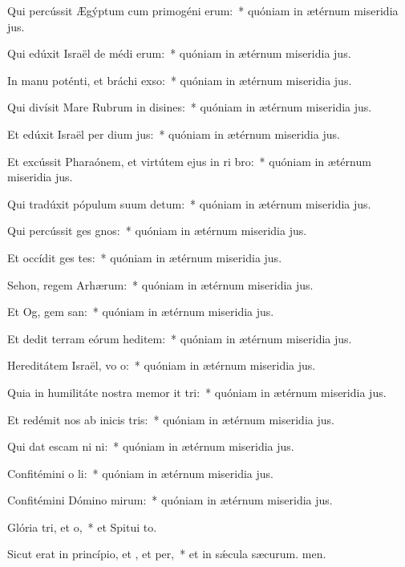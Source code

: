 \item Qui percússit Ægýptum cum primogéni erum:~* quóniam in ætérnum miseridia jus.
\item Qui edúxit Israël de médi erum:~* quóniam in ætérnum miseridia jus.
\item In manu poténti, et bráchi exso:~* quóniam in ætérnum miseridia jus.
\item Qui divísit Mare Rubrum in disines:~* quóniam in ætérnum miseridia jus.
\item Et edúxit Israël per dium jus:~* quóniam in ætérnum miseridia jus.
\item Et excússit Pharaónem, et virtútem ejus in ri bro:~* quóniam in ætérnum miseridia jus.
\item Qui tradúxit pópulum suum  detum:~* quóniam in ætérnum miseridia jus.
\item Qui percússit ges gnos:~* quóniam in ætérnum miseridia jus.
\item Et occídit ges tes:~* quóniam in ætérnum miseridia jus.
\item Sehon, regem Arhærum:~* quóniam in ætérnum miseridia jus.
\item Et Og, gem san:~* quóniam in ætérnum miseridia jus.
\item Et dedit terram eórum heditem:~* quóniam in ætérnum miseridia jus.
\item Hereditátem Israël, vo o:~* quóniam in ætérnum miseridia jus.
\item Quia in humilitáte nostra memor it tri:~* quóniam in ætérnum miseridia jus.
\item Et redémit nos ab inicis tris:~* quóniam in ætérnum miseridia jus.
\item Qui dat escam ni ni:~* quóniam in ætérnum miseridia jus.
\item Confitémini o li:~* quóniam in ætérnum miseridia jus.
\item Confitémini Dómino mirum:~* quóniam in ætérnum miseridia jus.
\item Glória tri, et o,~* et Spitui to.
\item Sicut erat in princípio, et , et per,~* et in sǽcula sæcurum. men.
